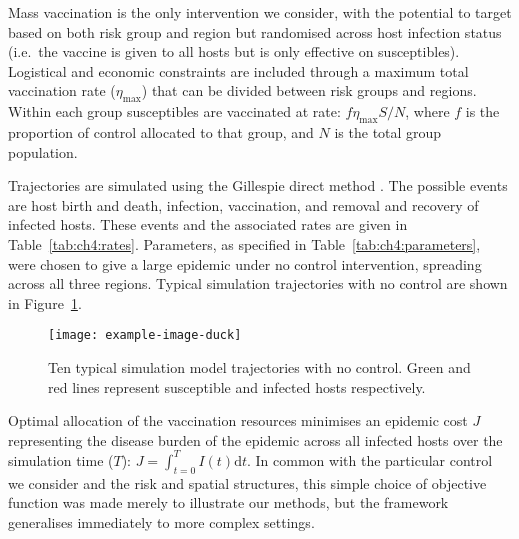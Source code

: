 Mass vaccination is the only intervention we consider, with the potential to target based on both risk group and region but randomised across host infection status (i.e.\ the vaccine is given to all hosts but is only effective on susceptibles). Logistical and economic constraints are included through a maximum total vaccination rate ($\eta_{\mathrm{max}}$) that can be divided between risk groups and regions. Within each group susceptibles are vaccinated at rate: $f\eta_{\mathrm{max}}S/N$, where $f$ is the proportion of control allocated to that group, and $N$ is the total group population.

Trajectories are simulated using the Gillespie direct method \cite{gillespie_exact_1977}. The possible events are host birth and death, infection, vaccination, and removal and recovery of infected hosts. These events and the associated rates are given in Table~\ref{tab:ch4:rates}. Parameters, as specified in Table~\ref{tab:ch4:parameters}, were chosen to give a large epidemic under no control intervention, spreading across all three regions. Typical simulation trajectories with no control are shown in Figure~\ref{fig:ch4:no_control_dpc}.

\begin{figure}[htb]
    \begin{center}
        \texttt{[image: example-image-duck]}%
        \caption{Ten typical simulation model trajectories with no control. Green and red lines represent susceptible and infected hosts respectively.}
        \label{fig:ch4:no_control_dpc}
    \end{center}
\end{figure}

Optimal allocation of the vaccination resources minimises an epidemic cost $J$ representing the disease burden of the epidemic across all infected hosts over the simulation time ($T$): $J = \int_{t=0}^TI(t)\mathrm{d}t$. In common with the particular control we consider and the risk and spatial structures, this simple choice of objective function was made merely to illustrate our methods, but the framework generalises immediately to more complex settings.

